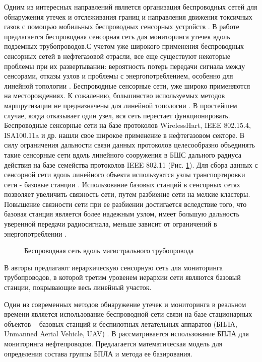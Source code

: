 Одним из интересных направлений является организация беспроводных сетей для обнаружения утечек и отслеживания границ и направления движения токсичных газов с помощью мобильных беспроводных сенсорных устройств \cite{Krzyszton2021}. В работе \cite{Lin2019} предлагается беспроводная сенсорная сеть для мониторинга утечек вдоль подземных трубопроводов.С учетом уже широкого применения беспроводных сенсорных сетей в нефтегазовой отрасли, все еще существуют некоторые
проблемы при их развертывании: вероятность потерь передачи сигнала между сенсорами, отказы узлов и проблемы с энергопотреблением, особенно для линейной топологии \cite{Lee2020}. Беспроводные сенсорные сети, уже широко применяются на месторождениях. К сожалению, большинство используемых методов маршрутизации не предназначены для линейной топологии \cite{Abbas2018}. В простейшем случае, когда отказывает один узел, вся сеть перестает функционировать. Беспроводные сенсорные сети на базе протоколов WirelessHart, IEEE 802.15.4, ISA100.11a и др. нашли свое широкое применение в нефтегазовом секторе. В силу ограничения дальности связи данных протоколов целесообразно объединять такие сенсорные сети вдоль линейного сооружения в БШС дального радиуса действия на базе семейства протоколов IEEE 802.11 (Рис. \ref{fig:part2_pipeline}). Для сбора данных с сенсорной сети вдоль линейного объекта используются узлы транспортировки сети -  базовые станции \cite{Fataliyev2018}.  Использование базовых станций в сенсорных сетях позволяет увеличить связность сети, путем разбиение сети на мелкие кластеры. Повышение связности сети при ее разбиении достигается вследствие того, что базовая станция является более надежным узлом, имеет большую дальность уверенной передачи радиосигнала, меньше зависит от ограничений в энергопотреблении \cite{Krasnov2016}.

\begin{figure}[ht]
  \caption{Беспроводная сеть вдоль магистрального трубопровода}\label{fig:part2_pipeline}
\end{figure}

В \cite{Anupama2014, Jawhar2007} авторы предлагают иерархическую сенсорную сеть для мониторинга трубопроводов, в которой третим уровенем иерархии сети являются базовый станции, покрывающие весь линейный участок.

Один из современных методов обнаружение утечек и мониторинга в реальном времени является использование беспроводной сети связи на базе стационарных объектов -- базовых станций и  беспилотных летательных аппаратов  (БПЛА, Unmanned Aerial Vehicle, UAV) \cite{Aljuaid2020}. В \cite{Fedorova2020} рассматривается использование БПЛА для мониторинга нефтепроводов. Предлагается математическая модель для определения состава группы БПЛА и метода ее базирования.


